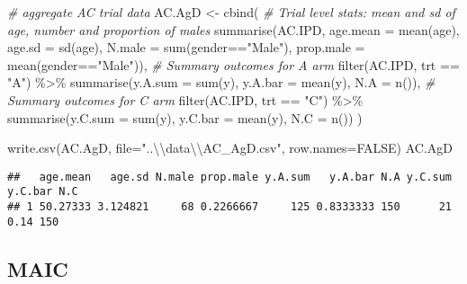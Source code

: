 \documentclass[
]{article}
\newenvironment{Shaded}{\begin{snugshade}}{\end{snugshade}}
\newcommand{\AttributeTok}[1]{\textcolor[rgb]{0.77,0.63,0.00}{#1}}
\newcommand{\CommentTok}[1]{\textcolor[rgb]{0.56,0.35,0.01}{\textit{#1}}}
\newcommand{\ConstantTok}[1]{\textcolor[rgb]{0.00,0.00,0.00}{#1}}
\newcommand{\FunctionTok}[1]{\textcolor[rgb]{0.00,0.00,0.00}{#1}}
\newcommand{\NormalTok}[1]{#1}
\newcommand{\OtherTok}[1]{\textcolor[rgb]{0.56,0.35,0.01}{#1}}
\newcommand{\SpecialCharTok}[1]{\textcolor[rgb]{0.00,0.00,0.00}{#1}}
\newcommand{\StringTok}[1]{\textcolor[rgb]{0.31,0.60,0.02}{#1}}
\begin{document}
\begin{Shaded}
\begin{Highlighting}[]
\CommentTok{\# aggregate AC trial data}
\NormalTok{AC.AgD }\OtherTok{\textless{}{-}}
  \FunctionTok{cbind}\NormalTok{(}
    \CommentTok{\# Trial level stats: mean and sd of age, number and proportion of males}
    \FunctionTok{summarise}\NormalTok{(AC.IPD, }\AttributeTok{age.mean =} \FunctionTok{mean}\NormalTok{(age), }\AttributeTok{age.sd =} \FunctionTok{sd}\NormalTok{(age),}
              \AttributeTok{N.male =} \FunctionTok{sum}\NormalTok{(gender}\SpecialCharTok{==}\StringTok{"Male"}\NormalTok{), }\AttributeTok{prop.male =} \FunctionTok{mean}\NormalTok{(gender}\SpecialCharTok{==}\StringTok{"Male"}\NormalTok{)),}
    \CommentTok{\# Summary outcomes for A arm}
    \FunctionTok{filter}\NormalTok{(AC.IPD, trt }\SpecialCharTok{==} \StringTok{"A"}\NormalTok{) }\SpecialCharTok{\%\textgreater{}\%}
      \FunctionTok{summarise}\NormalTok{(}\AttributeTok{y.A.sum =} \FunctionTok{sum}\NormalTok{(y), }\AttributeTok{y.A.bar =} \FunctionTok{mean}\NormalTok{(y), }\AttributeTok{N.A =} \FunctionTok{n}\NormalTok{()),}
    \CommentTok{\# Summary outcomes for C arm}
    \FunctionTok{filter}\NormalTok{(AC.IPD, trt }\SpecialCharTok{==} \StringTok{"C"}\NormalTok{) }\SpecialCharTok{\%\textgreater{}\%}
      \FunctionTok{summarise}\NormalTok{(}\AttributeTok{y.C.sum =} \FunctionTok{sum}\NormalTok{(y), }\AttributeTok{y.C.bar =} \FunctionTok{mean}\NormalTok{(y), }\AttributeTok{N.C =} \FunctionTok{n}\NormalTok{())}
\NormalTok{  )}

\FunctionTok{write.csv}\NormalTok{(AC.AgD, }\AttributeTok{file=}\StringTok{"..}\SpecialCharTok{\textbackslash{}\textbackslash{}}\StringTok{data}\SpecialCharTok{\textbackslash{}\textbackslash{}}\StringTok{AC\_AgD.csv"}\NormalTok{, }\AttributeTok{row.names=}\ConstantTok{FALSE}\NormalTok{)}
\NormalTok{AC.AgD}
\end{Highlighting}
\end{Shaded}

\begin{verbatim}
##   age.mean   age.sd N.male prop.male y.A.sum   y.A.bar N.A y.C.sum y.C.bar N.C
## 1 50.27333 3.124821     68 0.2266667     125 0.8333333 150      21    0.14 150
\end{verbatim}

\hypertarget{maic}{%
\subsection{MAIC}\label{maic}}
\end{document}
